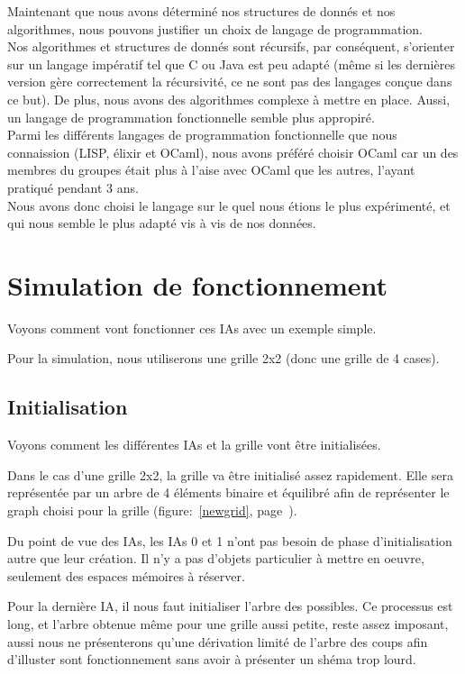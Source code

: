 \documentclass[a4paper,12pt]{report}
\begin{document}
Maintenant que nous avons d\'etermin\'e nos structures de donn\'es et nos algorithmes, nous pouvons justifier un choix de langage de programmation. \\
Nos algorithmes et structures de donn\'es sont r\'ecursifs, par cons\'equent, s'orienter sur un langage imp\'eratif tel que C ou Java est peu adapt\'e (m\^eme si les derni\`eres version g\`ere correctement la r\'ecursivit\'e, ce ne sont pas des langages con\c{c}ue dans ce but). De plus, nous avons des algorithmes complexe \`a mettre en place. Aussi, un langage de programmation fonctionnelle semble plus appropir\'e. \\
Parmi les diff\'erents langages de programmation fonctionnelle que nous connaission (LISP, \'elixir et OCaml), nous avons pr\'ef\'er\'e choisir OCaml car un des membres du groupes \'etait plus \`a l'aise avec OCaml que les autres, l'ayant pratiqu\'e pendant 3 ans. \\
Nous avons donc choisi le langage sur le quel nous \'etions le plus exp\'eriment\'e, et qui nous semble le plus adapt\'e vis \`a vis de nos donn\'ees.

\part{Simulation de fonctionnement}

Voyons comment vont fonctionner ces IAs avec un exemple simple. 


Pour la simulation, nous utiliserons une grille 2x2 (donc une grille de 4 cases). 

\chapter{Initialisation}

Voyons comment les diff\'erentes IAs et la grille vont \^etre initialis\'ees. 

Dans le cas d'une grille 2x2, la grille va \^etre initialis\'e assez rapidement. Elle sera repr\'esent\'ee par un arbre de 4 \'el\'ements binaire et \'equilibr\'e afin de repr\'esenter le graph choisi pour la grille (figure:~\autoref{newgrid}, page~\pageref{newgrid}).

Du point de vue des IAs, les IAs 0 et 1 n'ont pas besoin de phase d'initialisation autre que leur cr\'eation. Il n'y a pas d'objets particulier \`a mettre en oeuvre, seulement des espaces m\'emoires \`a r\'eserver. 

Pour la derni\`ere IA, il nous faut initialiser l'arbre des possibles. Ce processus est long, et l'arbre obtenue m\^eme pour une grille aussi petite, reste assez imposant, aussi nous ne pr\'esenterons qu'une d\'erivation limit\'e de l'arbre des coups afin d'illuster sont fonctionnement sans avoir \`a pr\'esenter un sh\'ema trop lourd.
\end{document}
